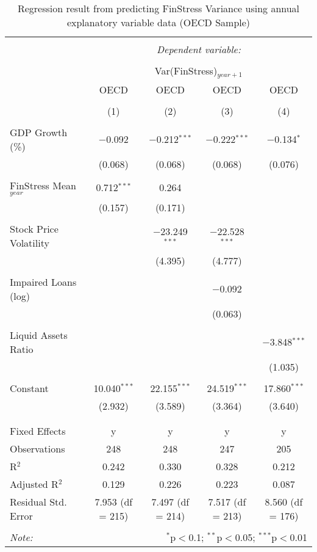 
\begin{table}[!htbp] \centering 
  \caption{Regression result from predicting FinStress Variance using annual explanatory variable data (OECD Sample)} 
  \label{annual_reg} 
\tiny 
\begin{tabular}{@{\extracolsep{5pt}}lcccc} 
\\[-1.8ex]\hline 
\hline \\[-1.8ex] 
 & \multicolumn{4}{c}{\textit{Dependent variable:}} \\ 
\cline{2-5} 
\\[-1.8ex] & \multicolumn{4}{c}{Var(FinStress)$_{year+1}$} \\ 
 & OECD & OECD & OECD & OECD \\ 
\\[-1.8ex] & (1) & (2) & (3) & (4)\\ 
\hline \\[-1.8ex] 
 GDP Growth (\%) & $-$0.092 & $-$0.212$^{***}$ & $-$0.222$^{***}$ & $-$0.134$^{*}$ \\ 
  & (0.068) & (0.068) & (0.068) & (0.076) \\ 
  & & & & \\ 
 FinStress Mean$_{year}$ & 0.712$^{***}$ & 0.264 &  &  \\ 
  & (0.157) & (0.171) &  &  \\ 
  & & & & \\ 
 Stock Price Volatility &  & $-$23.249$^{***}$ & $-$22.528$^{***}$ &  \\ 
  &  & (4.395) & (4.777) &  \\ 
  & & & & \\ 
 Impaired Loans (log) &  &  & $-$0.092 &  \\ 
  &  &  & (0.063) &  \\ 
  & & & & \\ 
 Liquid Assets Ratio &  &  &  & $-$3.848$^{***}$ \\ 
  &  &  &  & (1.035) \\ 
  & & & & \\ 
 Constant & 10.040$^{***}$ & 22.155$^{***}$ & 24.519$^{***}$ & 17.860$^{***}$ \\ 
  & (2.932) & (3.589) & (3.364) & (3.640) \\ 
  & & & & \\ 
\hline \\[-1.8ex] 
Fixed Effects & y & y & y & y \\ 
Observations & 248 & 248 & 247 & 205 \\ 
R$^{2}$ & 0.242 & 0.330 & 0.328 & 0.212 \\ 
Adjusted R$^{2}$ & 0.129 & 0.226 & 0.223 & 0.087 \\ 
Residual Std. Error & 7.953 (df = 215) & 7.497 (df = 214) & 7.517 (df = 213) & 8.560 (df = 176) \\ 
\hline 
\hline \\[-1.8ex] 
\textit{Note:}  & \multicolumn{4}{r}{$^{*}$p$<$0.1; $^{**}$p$<$0.05; $^{***}$p$<$0.01} \\ 
\end{tabular} 
\end{table} 
